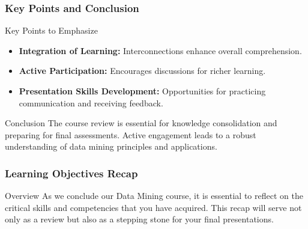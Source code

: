 \documentclass[aspectratio=169]{beamer}
\begin{document}
\begin{frame}[fragile]
    \frametitle{Key Points and Conclusion}
    \begin{block}{Key Points to Emphasize}
        \begin{itemize}
            \item \textbf{Integration of Learning:} Interconnections enhance overall comprehension.
            \item \textbf{Active Participation:} Encourages discussions for richer learning.
            \item \textbf{Presentation Skills Development:} Opportunities for practicing communication and receiving feedback.
        \end{itemize}
    \end{block}

    \begin{block}{Conclusion}
        The course review is essential for knowledge consolidation and preparing for final assessments. Active engagement leads to a robust understanding of data mining principles and applications.
    \end{block}
\end{frame}

\begin{frame}[fragile]
    \frametitle{Learning Objectives Recap}
    \begin{block}{Overview}
        As we conclude our Data Mining course, it is essential to reflect on the critical skills and competencies that you have acquired. This recap will serve not only as a review but also as a stepping stone for your final presentations.
    \end{block}
\end{frame}
\end{document}
